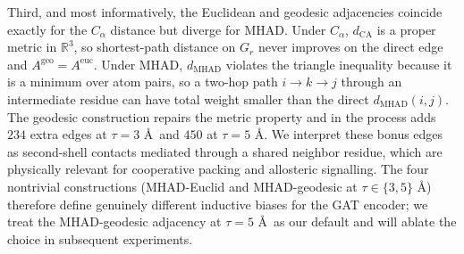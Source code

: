 \documentclass[conference]{IEEEtran}
\begin{document}
Third, and most informatively, the Euclidean and geodesic adjacencies coincide exactly for the $C_\alpha$ distance but diverge for MHAD. Under $C_\alpha$, $d_{\mathrm{CA}}$ is a proper metric in $\mathbb{R}^3$, so shortest-path distance on $G_r$ never improves on the direct edge and $A^{\mathrm{geo}} = A^{\mathrm{euc}}$. Under MHAD, $d_{\mathrm{MHAD}}$ violates the triangle inequality because it is a minimum over atom pairs, so a two-hop path $i \to k \to j$ through an intermediate residue can have total weight smaller than the direct $d_{\mathrm{MHAD}}(i,j)$. The geodesic construction repairs the metric property and in the process adds $234$ extra edges at $\tau = 3$ \AA\ and $450$ at $\tau = 5$ \AA. We interpret these bonus edges as second-shell contacts mediated through a shared neighbor residue, which are physically relevant for cooperative packing and allosteric signalling. The four nontrivial constructions (MHAD-Euclid and MHAD-geodesic at $\tau \in \{3, 5\}$ \AA) therefore define genuinely different inductive biases for the GAT encoder; we treat the MHAD-geodesic adjacency at $\tau = 5$ \AA\ as our default and will ablate the choice in subsequent experiments.
\end{document}
